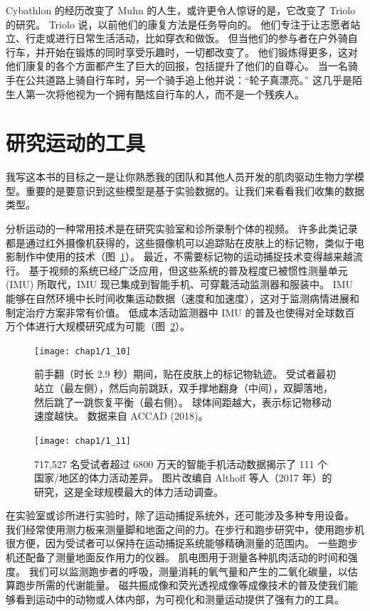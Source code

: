 Cybathlon 的经历改变了 Muhn 的人生，或许更令人惊讶的是，它改变了 Triolo 的研究。
Triolo 说，以前他们的康复方法是任务导向的。
他们专注于让志愿者站立、行走或进行日常生活活动，比如穿衣和做饭。
但当他们的参与者在户外骑自行车，并开始在锻炼的同时享受乐趣时，一切都改变了。
他们锻炼得更多，这对他们康复的各个方面都产生了巨大的回报，包括提升了他们的自尊心。
当一名骑手在公共道路上骑自行车时，另一个骑手追上他并说：“轮子真漂亮。”
这几乎是陌生人第一次将他视为一个拥有酷炫自行车的人，而不是一个残疾人。



\section{研究运动的工具}

我写这本书的目标之一是让你熟悉我的团队和其他人员开发的肌肉驱动生物力学模型。重要的是要意识到这些模型是基于实验数据的。让我们来看看我们收集的数据类型。



分析运动的一种常用技术是在研究实验室和诊所录制个体的视频。
许多此类记录都是通过红外摄像机获得的，这些摄像机可以追踪贴在皮肤上的标记物，类似于电影制作中使用的技术（图~\ref{fig:1_10}）。
最近，不需要标记物的运动捕捉技术变得越来越流行。
基于视频的系统已经广泛应用，但这些系统的普及程度已被惯性测量单元 (IMU) 所取代，IMU 现已集成到智能手机、可穿戴活动监测器和服装中。
IMU 能够在自然环境中长时间收集运动数据（速度和加速度），这对于监测病情进展和制定治疗方案非常有价值。
低成本活动监测器中 IMU 的普及也使得对全球数百万个体进行大规模研究成为可能（图~\ref{fig:1_11}）。


\begin{figure}[!htb]
	\centering
	\texttt{[image: chap1/1\_10]}
	\caption{前手翻（时长 2.9 秒）期间，贴在皮肤上的标记物轨迹。
		受试者最初站立（最左侧），然后向前跳跃，双手撑地翻身（中间），双脚落地，然后跳了一跳恢复平衡（最右侧）。
		球体间距越大，表示标记物移动速度越快。
		数据来自 ACCAD (2018)。 \label{fig:1_10}}
\end{figure}


\begin{figure}[!htb]
	\centering
	\texttt{[image: chap1/1\_11]}
	\caption{717,527 名受试者超过 6800 万天的智能手机活动数据揭示了 111 个国家/地区的体力活动差异。
		图片改编自 Althoff 等人（2017 年）的研究，这是全球规模最大的体力活动调查。 \label{fig:1_11}}
\end{figure}


在实验室或诊所进行实验时，除了运动捕捉系统外，还可能涉及多种专用设备。
我们经常使用测力板来测量脚和地面之间的力。在步行和跑步研究中，使用跑步机很方便，因为受试者可以保持在运动捕捉系统能够精确测量的范围内。
一些跑步机还配备了测量地面反作用力的仪器。
肌电图用于测量各种肌肉活动的时间和强度。
我们可以监测跑步者的呼吸，测量消耗的氧气量和产生的二氧化碳量，以估算跑步所需的代谢能量。
磁共振成像和荧光透视成像等成像技术的普及使我们能够看到运动中的动物或人体内部，为可视化和测量运动提供了强有力的工具。


